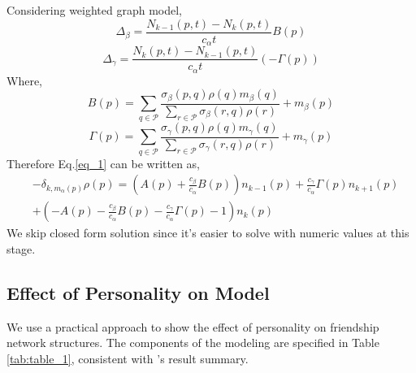\documentclass[runningheads]{llncs}
\begin{document}
Considering weighted graph model,
\begin{equation}\label{eq_6}
\Delta_{\beta}=\frac{N_{k-1}(p, t)-N_{k}(p, t)}{c_{\alpha} t} B(p)\end{equation}
\begin{equation}\label{eq_7}
\Delta_{\gamma}=\frac{N_{k}(p, t)-N_{k-1}(p, t)}{c_{\alpha} t}(-\Gamma(p))\end{equation}
Where, 
\begin{equation}\label{eq_8}
B(p)=\sum_{q \in \mathcal{P}} \frac{\sigma_{\beta}(p, q) \rho(q) m_{\beta}(q)}{\sum_{r \in \mathcal{P}} \sigma_{\beta}(r, q) \rho(r)}+m_{\beta}(p)\end{equation}
\begin{equation}\label{eq_9}
\Gamma(p)=\sum_{q \in \mathcal{P}} \frac{\sigma_{\gamma}(p, q) \rho(q) m_{\gamma}(q)}{\sum_{r \in \mathcal{P}} \sigma_{\gamma}(r, q) \rho(r)}+m_{\gamma}(p)\end{equation}
Therefore Eq.\ref{eq_1} can be written as, 
\begin{equation}\label{eq_10}
\begin{aligned}
&-\delta_{k, m_{\alpha}(p)} \rho(p) =\left(A(p)+\frac{c_{\beta}}{c_{\alpha}} B(p)\right) n_{k-1}(p)+\frac{c_{\gamma}}{c_{\alpha}} \Gamma(p) n_{k+1}(p) \\
&+\left(-A(p)-\frac{c_{\beta}}{c_{\alpha}} B(p)-\frac{c_{\gamma}}{c_{\alpha}} \Gamma(p)-1\right) n_{k}(p)
\end{aligned}\end{equation}
We skip closed form solution since it’s easier to solve with numeric values at this stage.

\subsection{Effect of Personality on Model}
We use a practical approach to show the effect of personality on friendship network structures. The components of the modeling are specified in Table \ref{tab:table_1}, consistent with \cite{ref_16}’s result summary.
\end{document}
